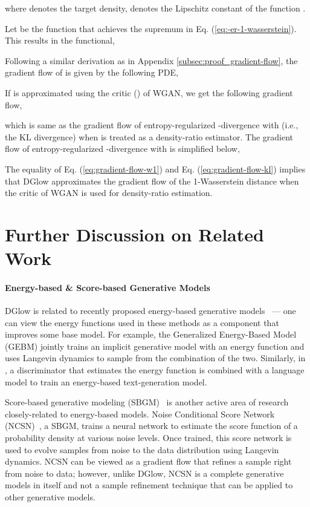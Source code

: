 \documentclass{article} \usepackage{iclr2021_conference,times}
\newcommand{\ourmethod}{\textsc{DG}low}
\begin{document}
where  denotes the target density,  denotes the Lipschitz constant of the function . 

Let  be the function that achieves the supremum in Eq. (\ref{eq:-er-1-wasserstein}). This results in the functional,


Following a similar derivation as in Appendix \ref{subsec:proof_gradient-flow}, the gradient flow of  is given by the following PDE,


If  is approximated using the critic () of WGAN, we get the following gradient flow, 

which is same as the gradient flow of entropy-regularized -divergence with  (i.e., the KL divergence) when  is treated as a density-ratio estimator. The gradient flow of entropy-regularized -divergence with  is simplified below,


The equality of Eq. (\ref{eq:gradient-flow-w1}) and Eq. (\ref{eq:gradient-flow-kl}) implies that \ourmethod{} approximates the gradient flow of the 1-Wasserstein distance when the critic of WGAN is used for density-ratio estimation.

\section{Further Discussion on Related Work}
\label{app:relatedwork}
\paragraph{Energy-based \& Score-based Generative Models} 
\ourmethod{} is related to recently proposed energy-based generative models~\citep{arbel2020generalized, Deng2020Residual} --- one can view the energy functions used in these methods as a component that improves some base model. For example, the Generalized Energy-Based Model (GEBM) \citep{arbel2020generalized} jointly trains an implicit generative model with an energy function and uses Langevin dynamics to sample from the combination of the two. Similarly, in \citet{Deng2020Residual}, a discriminator that estimates the energy function is combined with a language model to train an energy-based text-generation model. 

Score-based generative modeling (SBGM)~\citep{song2019generative,song2020improved} is another active area of research closely-related to energy-based models. Noise Conditional Score Network (NCSN)~\citep{song2019generative,song2020improved}, a SBGM, trains a neural network to estimate the score function of a probability density at various noise levels. Once trained, this score network is used to evolve samples from noise to the data distribution using Langevin dynamics. NCSN can be viewed as a gradient flow that refines a sample right from noise to data; however, unlike \ourmethod{}, NCSN is a complete generative models in itself and not a sample refinement technique that can be applied to other generative models.
\end{document}
